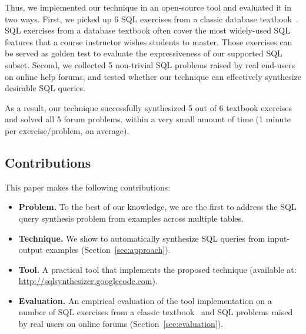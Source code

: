 Thus, we implemented our technique in an open-source tool
and evaluated it in two ways. First, we picked up 6 SQL
exercises from a classic database textbook~\cite{cowbook}. SQL exercises
from a database textbook often cover
the most widely-used SQL features 
that a course instructor wishes students to master.
Those exercises can be served as golden test
to evaluate the expressiveness of our supported SQL subset. Second,
we collected 5 non-trivial SQL problems raised by real end-users on online
help forums, and tested whether our technique can effectively synthesize desirable
SQL queries.

As a result, our technique successfully synthesized 5 out of 6
textbook exercises and solved all 5 forum problems, within a very
small amount of time (1 minute per exercise/problem, on average).

\subsection{Contributions}

This paper makes the following contributions:

\begin{itemize}
\item \textbf{Problem.} To the best of our knowledge, we are the first
to address the SQL query synthesis problem from examples across multiple
tables.

\item \textbf{Technique.} We show to automatically synthesize SQL
queries from input-output examples (Section~\ref{sec:approach}).

\item \textbf{Tool.} A practical tool that implements the proposed technique (available at:
\url{http://sqlsynthesizer.googlecode.com}).

\item \textbf{Evaluation.} An empirical evaluation of the tool implementation
on a number of SQL exercises from a classic textbook~\cite{cowbook}
and SQL problems raised by real users on online forums (Section~\ref{sec:evaluation}).
\end{itemize}
